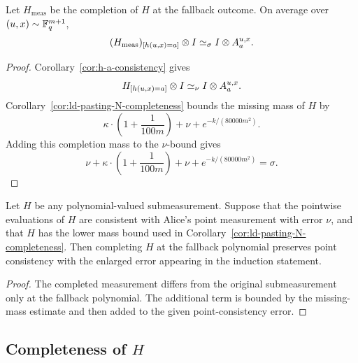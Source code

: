 \begin{corollary}
	\label{cor:h-a-consistency-completed}
	\leanok
	Let $H_{\mathrm{meas}}$ be the completion of $H$ at the fallback outcome.
	On average over $(u,x) \sim \mathbb{F}_q^{m+1}$,
	\[
		(H_{\mathrm{meas}})_{[h(u,x)=a]} \otimes I \simeq_{\sigma} I \otimes A_a^{u,x}.
	\]
\end{corollary}
\begin{proof}
	\leanok
	Corollary~\ref{cor:h-a-consistency} gives
	\[
		H_{[h(u,x)=a]} \otimes I \simeq_{\nu} I \otimes A_a^{u,x}.
	\]
	Corollary~\ref{cor:ld-pasting-N-completeness} bounds the missing mass of $H$ by
	\[
		\kappa \cdot \left(1 + \frac{1}{100m}\right) + \nu + e^{-k/(80000m^2)}.
	\]
	Adding this completion mass to the $\nu$-bound gives
	\[
		\nu + \kappa \cdot \left(1 + \frac{1}{100m}\right) + \nu +
		e^{-k/(80000m^2)} = \sigma.
	\]
\end{proof}

\begin{lemma}
	\label{lem:h-a-consistency-completed-from-submeas}
	\leanok
	Let $H$ be any polynomial-valued submeasurement. Suppose that the pointwise
	evaluations of $H$ are consistent with Alice's point measurement with error
	$\nu$, and that $H$ has the lower mass bound used in
	Corollary~\ref{cor:ld-pasting-N-completeness}. Then completing $H$ at the
	fallback polynomial preserves point consistency with the enlarged error
	appearing in the induction statement.
\end{lemma}
\begin{proof}
	\leanok
	The completed measurement differs from the original submeasurement only at
	the fallback polynomial.  The additional term is bounded by the missing-mass
	estimate and then added to the given point-consistency error.
\end{proof}

\subsection{Completeness of $H$}
\label{sec:completeness-of-h-low-degree}

